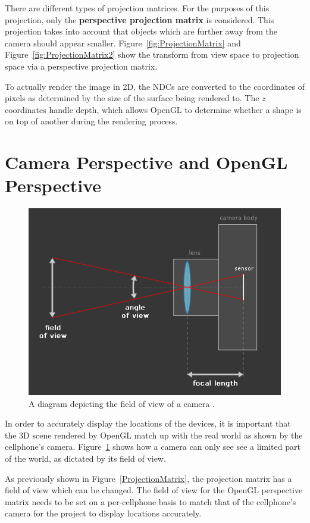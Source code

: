 There are different types of projection matrices. For the purposes of this projection, only the \textbf{perspective projection matrix} is considered. This projection takes into account that objects which are further away from the camera should appear smaller. Figure~\ref{fig:ProjectionMatrix} and Figure~\ref{fig:ProjectionMatrix2} show the transform from view space to projection space via a perspective projection matrix.

To actually render the image in 2D, the NDCs are converted to the coordinates of pixels as determined by the size of the surface being rendered to. The $z$ coordinates handle depth, which allows OpenGL to determine whether a shape is on top of another during the rendering process.

\section{Camera Perspective and OpenGL Perspective}
\begin{figure}
	\centering
	\includegraphics[width=\linewidth]{Figures/CameraLens.png}
	\decoRule
	\caption{A diagram depicting the field of view of a camera \cite{MartyBugs}.}
	\label{fig:CameraLens}
\end{figure}
In order to accurately display the locations of the devices, it is important that the 3D scene rendered by OpenGL match up with the real world as shown by the cellphone's camera. Figure~\ref{fig:CameraLens} shows how a camera can only see see a limited part of the world, as dictated by its field of view.

As previously shown in Figure~\ref{ProjectionMatrix}, the projection matrix has a field of view which can be changed. The field of view for the OpenGL perspective matrix needs to be set on a per-cellphone basis to match that of the cellphone's camera for the project to display locations accurately.

